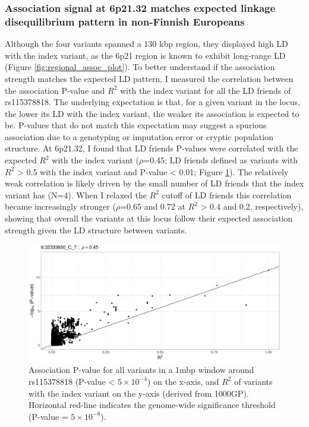     \subsubsection{Association signal at 6p21.32 matches expected linkage disequilibrium pattern in non-Finnish Europeans}
    Although the four variants spanned a 130 kbp region, they displayed high LD with the index variant, as the 6p21 region is known to exhibit long-range LD (Figure \ref{fig:regional_assoc_plot}). To better understand if the association strength matches the expected LD pattern, I measured the correlation between the association P-value and $R^{2}$ with the index variant for all the LD friends of rs115378818. The underlying expectation is that, for a given variant in the locus, the lower its LD with the index variant, the weaker its association is expected to be. P-values that do not match this expectation may suggest a spurious association due to a genotyping or imputation error or cryptic population structure. At 6p21.32, I found that LD friends P-values were correlated with the expected $R^{2}$ with the index variant ($\rho$=0.45; LD friends defined as variants with $R^{2}$ > 0.5 with the index variant and P-value < 0.01; Figure \ref{fig:ld_pval_plot}). The relatively weak correlation is likely driven by the small number of LD friends that the index variant has (N=4). When I relaxed the $R^{2}$ cutoff of LD friends this correlation became increasingly stronger ($\rho$=0.65 and 0.72 at $R^{2}$ > 0.4 and 0.2, respectively), showing that overall the variants at this locus follow their expected association strength given the LD structure between variants. 




    \begin{figure}[H] 
      \centering    
      \includegraphics[width=1.0\textwidth]{fig3}
      \caption[LD decay plot of the 6p21.32 locus]{Association P-value for all variants in a 1mbp window around rs115378818 (P-value < $5\times10^{-4}$) on the x-axis, and $R^{2}$ of variants with the index variant on the y-axis (derived from 1000GP). Horizontal red-line indicates the genome-wide significance threshold (P-value = $5\times10^{-8}$).}
      \label{fig:ld_pval_plot}
      \end{figure}


